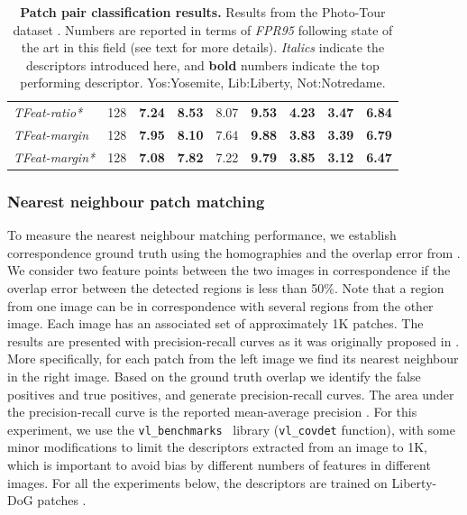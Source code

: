 \begin{table}
{\begin{tabular}{lcccccccc}
 {\em TFeat-ratio*} &  128 & \bf 7.24 & \bf 8.53 &  8.07 & \bf 9.53  & \bf 4.23 & \bf 3.47 & \bf 6.84  \\
 {\em TFeat-margin} &  128 & \bf 7.95 & \bf 8.10 &  7.64 &  \bf 9.88 & \bf 3.83  & \bf 3.39  & \bf 6.79 \\ 
 {\em TFeat-margin*} &  128 & \bf 7.08 & \bf 7.82 & 7.22 &  \bf 9.79  &  \bf 3.85  &  \bf 3.12 & \bf 6.47 \\ 
  \bottomrule
\end{tabular}}
  \caption[Patch pair classification results.]{\textbf{Patch pair classification results.} Results from the Photo-Tour dataset \cite{BHW10}. Numbers
    are reported in terms of {\em FPR95} following state of the art 
    in this field (see text for more details). {\em Italics} indicate
    the descriptors introduced here, and {\bf bold} numbers indicate
    the top performing descriptor. Yos:Yosemite, Lib:Liberty,
    Not:Notredame.}
\label{tab:benchmark_brown} 
\end{table}

\subsubsection{Nearest neighbour patch matching}

To measure the nearest neighbour matching performance, we establish
correspondence ground truth using the homographies and the overlap
error from \cite{schmid2003performance}.  We consider two feature
points between the two images in correspondence if the overlap error
between the detected regions is less than 50\%.  Note that a region
from one image can be in correspondence with several regions from the
other image.  Each image has an associated set of approximately 1K
patches.  The results are presented with precision-recall curves as it
was originally proposed in \cite{schmid2003performance}.  More
specifically, for each patch from the left image we find its nearest
neighbour in the right image.  Based on the ground truth overlap we
identify the false positives and true positives, and generate
precision-recall curves. The area under the precision-recall curve is
the reported mean-average precision
\cite{WHB09,ZagoruykoCVPR2015,DBLP:journals/corr/DongS14}.  For this
experiment, we use the \texttt{vl\_benchmarks}~\cite{vedaldi08vlfeat} library
(\texttt{vl\_covdet} function), with some minor modifications to limit
the descriptors extracted from an image to 1K, which is important to
avoid bias by different numbers of features in different images. For
all the experiments below, the descriptors are trained on Liberty-DoG
patches \cite{BHW10}.

